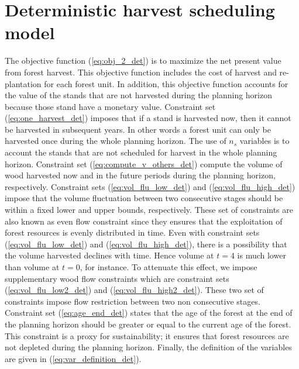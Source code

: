 \documentclass[forests,article,submit,moreauthors,pdftex]{Definitions/mdpi}
\begin{document}
\section{Deterministic harvest scheduling model} \label{app:det_harv}

The objective function (\ref{eq:obj_2_det}) is to maximize the net present value from forest harvest. This objective function includes the cost of harvest and re-plantation for each forest unit. In addition, this objective function accounts for the value of the stands that are not harvested during the planning horizon because those stand have a monetary value. Constraint set (\ref{eq:one_harvest_det}) imposes that if a stand is harvested now, then it cannot be harvested in subsequent years. In other words a forest unit can only be harvested once during the whole planning horizon. The use of $n_s$ variables is to account the stands that are not scheduled for harvest in the whole planning horizon.
Constraint set (\ref{eq:compute_v_others_det})  compute the volume of wood harvested  now and in the future periods during the planning horizon, respectively.
Constraint sets  (\ref{eq:vol_flu_low_det}) and  (\ref{eq:vol_flu_high_det}) impose that the volume fluctuation between two consecutive stages should be within a fixed lower and upper bounds, respectively. These set of constraints are also known as even flow constraint since they ensures that the exploitation of forest resources is evenly distributed in time. Even with constraint sets  (\ref{eq:vol_flu_low_det}) and  (\ref{eq:vol_flu_high_det}), there is a possibility that the volume harvested declines with time. Hence volume at $t=4$ is much lower than volume at $t=0$, for instance. To attenuate this effect, we impose supplementary wood flow constraints which are constraint sets (\ref{eq:vol_flu_low2_det}) and  (\ref{eq:vol_flu_high2_det}). These two set of constraints impose flow restriction between two non consecutive stages.
Constraint set (\ref{eq:age_end_det}) states that the age of the forest at the end of the planning horizon should be greater or equal to the current age of the forest. This constraint is a proxy for sustainability; it ensures that forest resources are not depleted during the planning horizon.  Finally, the definition of the variables are given in (\ref{eq:var_definition_det}).
\end{document}
